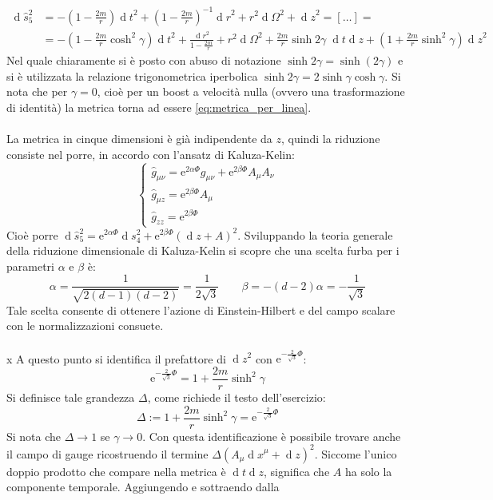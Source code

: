 \documentclass[]{scrartcl}
\newcommand{\me}{\mathrm{e}}
\newcommand{\hg}{\hat{g}}
\renewcommand{\d}[1]{\ensuremath{\operatorname{d}\!{#1}}}
\begin{document}
\begin{align*}
  \d{\hat{s}^2_5} & = - \left( 1 - \frac{2m}{r} \right) \d t^2 + \left( 1 - \frac{2m}{r} \right)^{-1} \d r^2 + r^2 \d \Omega^2 + \d z^2 = [\dots] = \\
                  & = - \left( 1 - \frac{2m}{r} \cosh^2 \gamma \right) \d t^2 + \frac{\d r^2}{1 - \frac{2m}{r}} + r^2 \d \Omega^2 +
                 \frac{2m}{r}\sinh 2\gamma \; \d t \d z + \left(1 + \frac{2m}{r}\sinh^2 \gamma \right) \d z^2
\end{align*}
Nel quale chiaramente si è posto con abuso di notazione $ \sinh 2 \gamma = \sinh (2\gamma) $ e si è utilizzata la relazione trigonometrica
iperbolica $ \sinh 2\gamma = 2 \sinh \gamma \cosh \gamma $. Si nota che per $ \gamma = 0 $,
cioè per un boost a velocità nulla (ovvero una trasformazione di identità) la metrica torna ad essere \eqref{eq:metrica_per_linea}. \\ \\
La metrica in cinque dimensioni è già indipendente da $ z $, quindi la riduzione consiste nel porre, in accordo con l'ansatz di Kaluza-Kelin:
\[
  \begin{cases}
    \hg_{\mu\nu} = \me^{2\alpha\Phi}g_{\mu\nu} + \me^{2\beta\Phi}A_\mu A_\nu \\
    \hg_{\mu z} = \me^{2\beta\Phi} A_\mu \\
    \hg_{zz} = \me^{2\beta\Phi}
  \end{cases}
\]
Cioè porre $ \d{\hat{s}^2_5} = \me^{2\alpha\Phi} \d{s^2_4} + \me^{2\beta\Phi}\left( \d z + A \right)^2 $. Sviluppando la teoria generale della riduzione
dimensionale di Kaluza-Kelin si scopre che una scelta furba per i parametri $ \alpha $ e $ \beta $ è:
\[
  \alpha = \frac{1}{\sqrt{2(d-1)(d-2)}} = \frac{1}{2\sqrt{3}} \qquad \beta = -(d-2)\alpha = - \frac{1}{\sqrt{3}}
\]
Tale scelta consente di ottenere l'azione di Einstein-Hilbert e del campo scalare con le normalizzazioni consuete. \\ \\ x
A questo punto si identifica il prefattore di $ \d z^2 $ con $ \me^{-\frac{2}{\sqrt{3}}\Phi} $:
\[
  \me^{-\frac{2}{\sqrt{3}}\Phi} = 1 + \frac{2m}{r}\sinh^2 \gamma
\]
Si definisce tale grandezza $ \Delta $, come richiede il testo dell'esercizio:
\[
  \Delta := 1 + \frac{2m}{r}\sinh^2 \gamma = \me^{-\frac{2}{\sqrt{3}}\Phi}
\]
Si nota che $ \Delta \to 1 $ se $ \gamma \to 0 $.
Con questa identificazione è possibile trovare anche il campo di gauge ricostruendo il termine $ \Delta (A_\mu \d x^\mu + \d z)^2 $. Siccome l'unico
doppio prodotto che compare nella metrica è $ \d t \d z $, significa che $ A $ ha solo la componente temporale. Aggiungendo e sottraendo dalla
\end{document}
